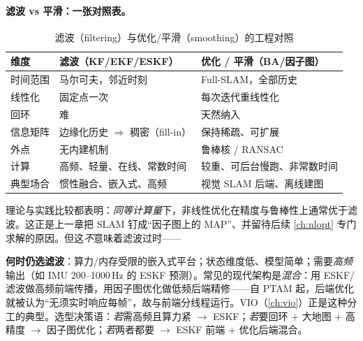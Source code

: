 \paragraph{滤波 vs 平滑：一张对照表。}
\begin{table}[H]\centering\small
\caption{滤波（filtering）与优化/平滑（smoothing）的工程对照}
\label{tab:filter-vs-opt}
\begin{tabular}{lll}
\toprule
维度 & 滤波（KF/EKF/ESKF） & 优化 / 平滑（BA/因子图） \\
\midrule
时间范围 & 马尔可夫，邻近时刻 & Full-SLAM，全部历史 \\
线性化 & 固定点一次 & 每次迭代重线性化 \\
回环 & 难 & 天然纳入 \\
信息矩阵 & 边缘化历史 $\Rightarrow$ 稠密（fill-in） & 保持稀疏、可扩展 \\
外点 & 无内建机制 & 鲁棒核 / RANSAC \\
计算 & 高频、轻量、在线、常数时间 & 较重、可后台慢跑、非常数时间 \\
典型场合 & 惯性融合、嵌入式、高频 & 视觉 SLAM 后端、离线建图 \\
\bottomrule
\end{tabular}
\end{table}

\noindent 理论与实践比较都表明：\emph{同等计算量}下，非线性优化在精度与鲁棒性上通常优于滤波\cite{gaoxiang2019slam14,carlone2026handbook}。这正是上一章把 SLAM 钉成“因子图上的 MAP”、并留待后续 \cref{ch:nlopt} 专门求解的原因。但这\emph{不}意味着滤波过时——

\begin{insight}
\textbf{何时仍选滤波}：算力/内存受限的嵌入式平台；状态维度低、模型简单；需要\emph{高频}输出（如 IMU 200--1000\,Hz 的 ESKF 预测）。常见的现代架构是\emph{混合}：用 ESKF/滤波做高频前端传播，用因子图优化做低频后端精修——自 PTAM 起，后端优化就被认为“无须实时响应每帧”，故与前端分线程运行\cite{gaoxiang2019slam14}。VIO（\cref{ch:vio}）正是这种分工的典型。选型决策语：\emph{若}需高频且算力紧 $\to$ ESKF；\emph{若}要回环 + 大地图 + 高精度 $\to$ 因子图优化；\emph{若}两者都要 $\to$ ESKF 前端 + 优化后端混合。
\end{insight}

